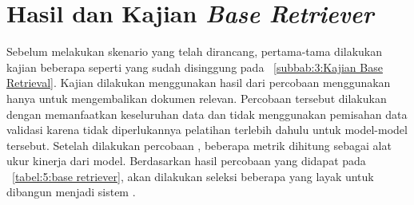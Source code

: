 \section{Hasil dan Kajian \textit{Base Retriever}}
\label{subbab:5:hasil dan kajian base retriever}
Sebelum melakukan skenario yang telah dirancang, pertama-tama dilakukan kajian beberapa \base{} \retriever{} seperti yang sudah disinggung pada \subbab{}~\ref{subbab:3:Kajian Base Retrieval}. Kajian dilakukan menggunakan hasil dari percobaan \retrieval{} menggunakan hanya \base{} \retriever{} untuk mengembalikan dokumen relevan. Percobaan tersebut dilakukan dengan memanfaatkan keseluruhan data \training{} dan tidak menggunakan pemisahan data validasi karena tidak diperlukannya pelatihan terlebih dahulu untuk model-model tersebut. Setelah dilakukan percobaan \retrieval{}, beberapa metrik dihitung sebagai alat ukur kinerja dari model. Berdasarkan hasil percobaan yang didapat pada \tabel{}~\ref{tabel:5:base retriever}, akan dilakukan seleksi beberapa \base{} \retriever{} yang layak untuk dibangun menjadi sistem \ir{}.
